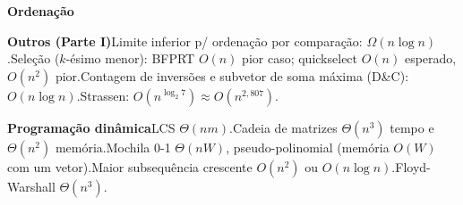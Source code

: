 \documentclass[11pt,a4paper]{article}
\theoremstyle{plain}
\theoremstyle{definition}
\theoremstyle{remark}
\numberwithin{equation}{section}
\begin{document}
\begin{center}
\medskip
\textbf{Ordenação}\\[2pt]

\medskip
\textbf{Outros (Parte I)}\quad Limite inferior p/ ordenação por comparação: $\Omega(n\log n)$.\quad Seleção ($k$-ésimo menor): BFPRT $O(n)$ pior caso; quickselect $O(n)$ esperado, $O(n^2)$ pior.\quad Contagem de inversões e subvetor de soma máxima (D\&C): $O(n\log n)$.\quad Strassen: $O(n^{\log_2 7})\approx O(n^{2{,}807})$.

\medskip
\textbf{Programação dinâmica}\quad LCS $\Theta(nm)$.\quad Cadeia de matrizes $\Theta(n^3)$ tempo e $\Theta(n^2)$ memória.\quad Mochila 0-1 $\Theta(nW)$, pseudo-polinomial (memória $O(W)$ com um vetor).\quad Maior subsequência crescente $O(n^2)$ ou $O(n\log n)$.\quad Floyd-Warshall $\Theta(n^3)$.


\end{center}
\end{document}
